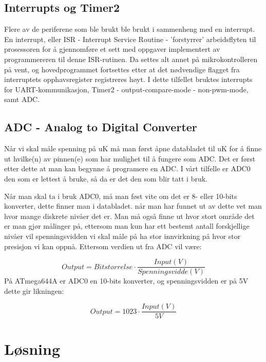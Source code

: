 \documentclass[12pt, a4paper]{report}
\begin{document}
\subsection{Interrupts og Timer2}
Flere av de periferene som ble brukt ble brukt i sammenheng med en interrupt. En interrupt, eller ISR - Interrupt Service Routine - 'forstyrrer' arbeidsflyten til prosessoren for å gjennomføre et sett med oppgaver implementert av programmereren til denne ISR-rutinen. Da settes alt annet på mikrokontrolleren på vent, og hovedprogrammet fortsettes etter at det nødvendige flagget fra interruptets opphavsregister registreres høyt. I dette tilfellet bruktes interrupts for UART-kommunikasjon, Timer2 - output-compare-mode - non-pwm-mode, samt ADC. 

\subsection{ADC - Analog to Digital Converter}
Når vi skal måle spenning på uK må man først åpne databladet til uK for å finne ut hvilke(n) av pinnen(e) som har mulighet til å fungere som ADC. Det er først etter dette at man kan begynne å programere en ADC. I vårt tilfelle er ADC0 den som er lettest å bruke, så da er det den som blir tatt i bruk.

Når man skal ta i bruk ADC0, må man føst vite om det er 8- eller 10-bits konverter, dette finner man i databladet. når man har funnet ut av dette vet man hvor mange diskrete nivåer det er. Man må også finne ut hvor stort område det er man gjør målinger på, ettersom man kun har ett bestemt antall forskjellige nivåer vil spenningsvidden vi skal måle på ha stor innvirkning på hvor stor presisjon vi kan oppnå. Ettersom verdien ut fra ADC vil være:

\begin{equation}
Output = Bitstørrelse \cdot \frac{Input(V)}{Spenningsvidde(V)}
\end{equation}
På ATmega644A er ADC0 en 10-bits konverter, og spenningsvidden er på 5V dette gir likningen:

\begin{equation}
Output = 1023 \cdot \frac{Input(V)}{5V}
\end{equation}


\section{Løsning}
\end{document}
